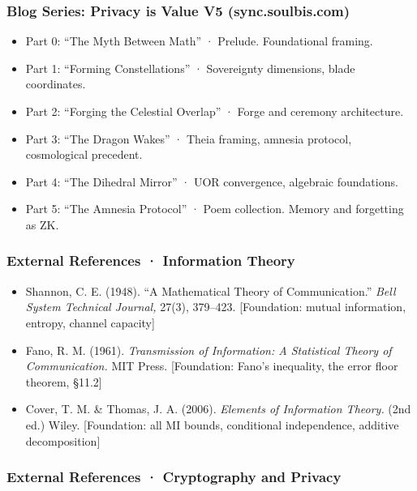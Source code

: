 \documentclass[
]{article}
\providecommand{\tightlist}{%
  \setlength{\itemsep}{0pt}\setlength{\parskip}{0pt}}
\begin{document}
\subsubsection{Blog Series: Privacy is Value V5
(sync.soulbis.com)}\label{blog-series-privacy-is-value-v5-sync.soulbis.com}

\begin{itemize}
\tightlist
\item
  Part 0: ``The Myth Between Math'' · Prelude. Foundational framing.
\item
  Part 1: ``Forming Constellations'' · Sovereignty dimensions, blade
  coordinates.
\item
  Part 2: ``Forging the Celestial Overlap'' · Forge and ceremony
  architecture.
\item
  Part 3: ``The Dragon Wakes'' · Theia framing, amnesia protocol,
  cosmological precedent.
\item
  Part 4: ``The Dihedral Mirror'' · UOR convergence, algebraic
  foundations.
\item
  Part 5: ``The Amnesia Protocol'' · Poem collection. Memory and
  forgetting as ZK.
\end{itemize}

\subsubsection{External References · Information
Theory}\label{external-references-information-theory}

\begin{itemize}
\tightlist
\item
  Shannon, C. E. (1948). ``A Mathematical Theory of Communication.''
  \emph{Bell System Technical Journal,} 27(3), 379--423. {[}Foundation:
  mutual information, entropy, channel capacity{]}
\item
  Fano, R. M. (1961). \emph{Transmission of Information: A Statistical
  Theory of Communication.} MIT Press. {[}Foundation: Fano's inequality,
  the error floor theorem, §11.2{]}
\item
  Cover, T. M. \& Thomas, J. A. (2006). \emph{Elements of Information
  Theory.} (2nd ed.) Wiley. {[}Foundation: all MI bounds, conditional
  independence, additive decomposition{]}
\end{itemize}

\subsubsection{External References · Cryptography and
Privacy}\label{external-references-cryptography-and-privacy}
\end{document}
